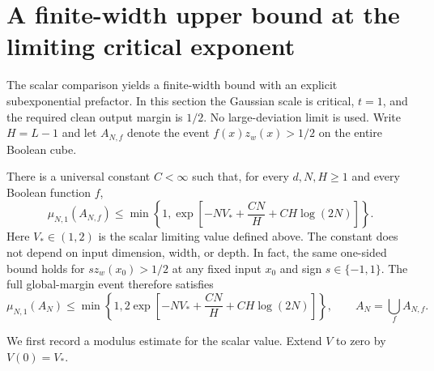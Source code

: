 \section{A finite-width upper bound at the limiting critical exponent}
\label{sec:finite-width-limiting-upper}

The scalar comparison yields a finite-width bound with an explicit
subexponential prefactor. In this section the Gaussian scale is critical,
$t=1$, and the required clean output margin is $1/2$.
No large-deviation limit is used.
Write $H=L-1$ and let $A_{N,f}$ denote the event
$f(x)z_w(x)>1/2$ on the entire Boolean cube.

\begin{theorem}
\label{thm:finite-width-limiting-upper}
There is a universal constant $C<\infty$ such that, for every
$d,N,H\ge1$ and every Boolean function $f$,
\begin{equation}\label{eq:finite-width-limiting-upper}
 \mu_{N,1}(A_{N,f})
 \le \min\left\{1,\exp\left[
       -NV_*+\frac{CN}{H}+CH\log(2N)\right]\right\}.
\end{equation}
Here $V_*\in(1,2)$ is the scalar limiting value defined above.
The constant does not depend on input dimension, width, or depth.
In fact, the same one-sided bound holds for
${s z_w(x_0)>1/2}$ at any fixed input $x_0$ and sign
$s\in\{-1,1\}$. The full global-margin event therefore satisfies
\[
 \mu_{N,1}(A_N)
 \le \min\left\{1,2\exp\left[
       -NV_*+\frac{CN}{H}+CH\log(2N)\right]\right\},
 \qquad A_N=\bigcup_f A_{N,f}.
\]
\end{theorem}

We first record a modulus estimate for the scalar value.
Extend $V$ to zero by $V(0)=V_*$.

